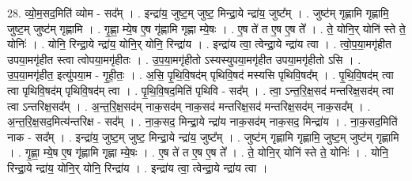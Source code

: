 \documentclass[17pt]{extarticle}
\begin{document}
28. व्यो॒म॒सद॒मिति॑ व्योम - सद᳚म् । . इन्द्रा॑य॒ जुष्ट॒म् जुष्ट॒ मिन्द्रा॒ये न्द्रा॑य॒ जुष्ट᳚म् । . जुष्ट॑म् गृह्णामि गृह्णामि॒ जुष्ट॒म् जुष्ट॑म् गृह्णामि । . गृ॒ह्णा॒ म्ये॒ष ए॒ष गृ॑ह्णामि गृह्णा म्ये॒षः । . ए॒ष ते॑ त ए॒ष ए॒ष ते᳚ । . ते॒ योनि॒र् योनि॑ स्ते ते॒ योनिः॑ । . योनि॒ रिन्द्रा॒ये न्द्रा॑य॒ योनि॒र् योनि॒ रिन्द्रा॑य । . इन्द्रा॑य त्वा॒ त्वेन्द्रा॒ये न्द्रा॑य त्वा । . त्वो॒प॒या॒मगृ॑हीत उपया॒मगृ॑हीत स्त्वा त्वोपया॒मगृ॑हीतः । . उ॒प॒या॒मगृ॑हीतो ऽस्यस्युपया॒मगृ॑हीत उपया॒मगृ॑हीतो ऽसि । . उ॒प॒या॒मगृ॑हीत॒ इत्यु॑पया॒म - गृ॒ही॒तः॒ । . अ॒सि॒ पृ॒थि॒वि॒षद॑म् पृथिवि॒षद॑ मस्यसि पृथिवि॒षद᳚म् । . पृ॒थि॒वि॒षद॑म् त्वा त्वा पृथिवि॒षद॑म् पृथिवि॒षद॑म् त्वा । . पृ॒थि॒वि॒षद॒मिति॑ पृथिवि - सद᳚म् । . त्वा॒ ऽन्त॒रि॒क्ष॒सद॑ मन्तरिक्ष॒सद॑म् त्वा त्वा ऽन्तरिक्ष॒सद᳚म् । . अ॒न्त॒रि॒क्ष॒सद॑म् नाक॒सद॑म् नाक॒सद॑ मन्तरिक्ष॒सद॑ मन्तरिक्ष॒सद॑म् नाक॒सद᳚म् । . अ॒न्त॒रि॒क्ष॒सद॒मित्य॑न्तरिक्ष - सद᳚म् । . ना॒क॒सद॒ मिन्द्रा॒ये न्द्रा॑य नाक॒सद॑म् नाक॒सद॒ मिन्द्रा॑य । . ना॒क॒सद॒मिति॑ नाक - सद᳚म् । . इन्द्रा॑य॒ जुष्ट॒म् जुष्ट॒ मिन्द्रा॒ये न्द्रा॑य॒ जुष्ट᳚म् । . जुष्ट॑म् गृह्णामि गृह्णामि॒ जुष्ट॒म् जुष्ट॑म् गृह्णामि । . गृ॒ह्णा॒ म्ये॒ष ए॒ष गृ॑ह्णामि गृह्णा म्ये॒षः । . ए॒ष ते॑ त ए॒ष ए॒ष ते᳚ । . ते॒ योनि॒र् योनि॑ स्ते ते॒ योनिः॑ । . योनि॒ रिन्द्रा॒ये न्द्रा॑य॒ योनि॒र् योनि॒ रिन्द्रा॑य । . इन्द्रा॑य त्वा॒ त्वेन्द्रा॒ये न्द्रा॑य त्वा । \newline
\end{document}
